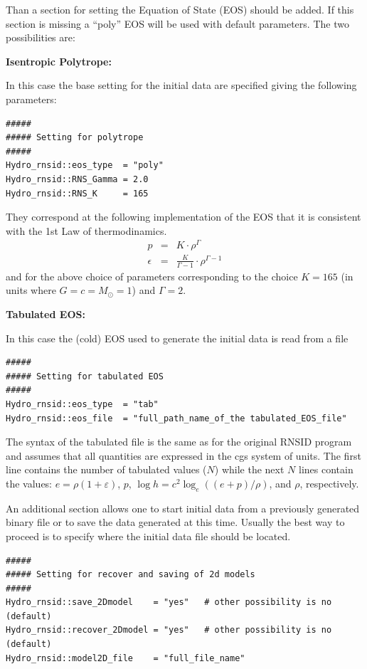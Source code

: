 \documentclass{article}
\begin{document}
Than a section for setting the Equation of State (EOS) should be added.
If this section is missing a ``poly'' EOS will be used with default parameters.
The two possibilities are:
\begin{description}
\item{\textbf{Isentropic Polytrope:}}
  
  In this case the base setting for the initial data are specified
  giving the following parameters:
\begin{verbatim}
#####
##### Setting for polytrope
#####
Hydro_rnsid::eos_type  = "poly"  
Hydro_rnsid::RNS_Gamma = 2.0
Hydro_rnsid::RNS_K     = 165   
\end{verbatim}
They correspond at the following implementation of the EOS
that it is consistent with the 1st Law of thermodinamics.
\begin{eqnarray}
   p         &=& K \cdot \rho^\Gamma \\
   \epsilon &=& \frac{K}{\Gamma-1} \cdot \rho^{\Gamma-1} 
\end{eqnarray}
and for the above choice of parameters corresponding to the choice $K=165$ (in units where $G=c=M_\odot=1$) and $\Gamma=2$.

\item{\textbf{Tabulated EOS:}}

  In this case the (cold) EOS used to
  generate the initial data is read from a file

\begin{verbatim}
#####
##### Setting for tabulated EOS
#####
Hydro_rnsid::eos_type  = "tab"   
Hydro_rnsid::eos_file  = "full_path_name_of_the tabulated_EOS_file"
\end{verbatim}
  The syntax of the tabulated file is the same as for the original
  RNSID program and assumes that all quantities are expressed in the
  cgs system of units. The first line contains the number of tabulated
  values ($N$) while the next $N$ lines contain the values:
  $e=\rho(1+\varepsilon)$, $p$, $\log h = c^2 \log_e((e+p)/\rho)$, and
  $\rho$, respectively.
\end{description}


An additional section allows one to start initial data from a
previously generated binary file or to save the data generated at this
time. Usually the best way to proceed is to specify where the initial
data file should be located.
\begin{verbatim}
#####
##### Setting for recover and saving of 2d models 
#####
Hydro_rnsid::save_2Dmodel    = "yes"   # other possibility is no (default)
Hydro_rnsid::recover_2Dmodel = "yes"   # other possibility is no (default)
Hydro_rnsid::model2D_file    = "full_file_name"
\end{verbatim}
\end{document}
